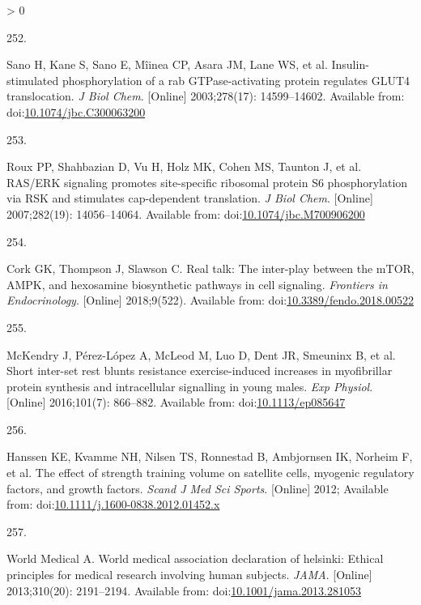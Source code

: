 \documentclass[twoside,10pt]{gihclass} %
\newlength{\cslhangindent}
\newlength{\csllabelwidth}
\newenvironment{CSLReferences}[3] %
 {%
  \setlength{\parindent}{0pt}
  \ifodd #1 \everypar{\setlength{\hangindent}{\cslhangindent}}\ignorespaces\fi
  \ifnum #2 > 0
  \setlength{\parskip}{#2\baselineskip}
  \fi
 }%
 {}
\newcommand{\CSLLeftMargin}[1]{\parbox[t]{\maxof{\widthof{#1}}{\csllabelwidth}}{#1}}
\newcommand{\CSLRightInline}[1]{\parbox[t]{\linewidth}{#1}}
\begin{document}
\begin{CSLReferences}{0}{0}
\leavevmode\hypertarget{ref-RN2856}{}%
\CSLLeftMargin{252. }
\CSLRightInline{Sano H, Kane S, Sano E, Mîinea CP, Asara JM, Lane WS, et al. Insulin-stimulated phosphorylation of a rab GTPase-activating protein regulates GLUT4 translocation. \emph{J Biol Chem}. {[}Online{]} 2003;278(17): 14599--14602. Available from: doi:\href{https://doi.org/10.1074/jbc.C300063200}{10.1074/jbc.C300063200}}

\leavevmode\hypertarget{ref-RN2311}{}%
\CSLLeftMargin{253. }
\CSLRightInline{Roux PP, Shahbazian D, Vu H, Holz MK, Cohen MS, Taunton J, et al. RAS/ERK signaling promotes site-specific ribosomal protein S6 phosphorylation via RSK and stimulates cap-dependent translation. \emph{J Biol Chem}. {[}Online{]} 2007;282(19): 14056--14064. Available from: doi:\href{https://doi.org/10.1074/jbc.M700906200}{10.1074/jbc.M700906200}}

\leavevmode\hypertarget{ref-RN2858}{}%
\CSLLeftMargin{254. }
\CSLRightInline{Cork GK, Thompson J, Slawson C. Real talk: The inter-play between the mTOR, AMPK, and hexosamine biosynthetic pathways in cell signaling. \emph{Frontiers in Endocrinology}. {[}Online{]} 2018;9(522). Available from: doi:\href{https://doi.org/10.3389/fendo.2018.00522}{10.3389/fendo.2018.00522}}

\leavevmode\hypertarget{ref-RN2857}{}%
\CSLLeftMargin{255. }
\CSLRightInline{McKendry J, Pérez-López A, McLeod M, Luo D, Dent JR, Smeuninx B, et al. Short inter-set rest blunts resistance exercise-induced increases in myofibrillar protein synthesis and intracellular signalling in young males. \emph{Exp Physiol}. {[}Online{]} 2016;101(7): 866--882. Available from: doi:\href{https://doi.org/10.1113/ep085647}{10.1113/ep085647}}

\leavevmode\hypertarget{ref-RN796}{}%
\CSLLeftMargin{256. }
\CSLRightInline{Hanssen KE, Kvamme NH, Nilsen TS, Ronnestad B, Ambjornsen IK, Norheim F, et al. The effect of strength training volume on satellite cells, myogenic regulatory factors, and growth factors. \emph{Scand J Med Sci Sports}. {[}Online{]} 2012; Available from: doi:\href{https://doi.org/10.1111/j.1600-0838.2012.01452.x}{10.1111/j.1600-0838.2012.01452.x}}

\leavevmode\hypertarget{ref-RN1590}{}%
\CSLLeftMargin{257. }
\CSLRightInline{World Medical A. World medical association declaration of helsinki: Ethical principles for medical research involving human subjects. \emph{JAMA}. {[}Online{]} 2013;310(20): 2191--2194. Available from: doi:\href{https://doi.org/10.1001/jama.2013.281053}{10.1001/jama.2013.281053}}


\end{CSLReferences}
\end{document}
